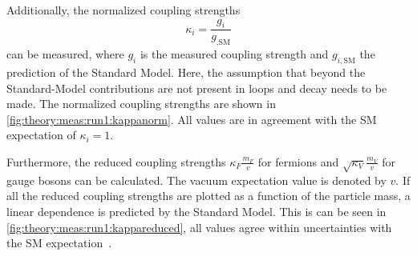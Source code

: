 Additionally, the normalized coupling strengths
\begin{equation}
    \kappa_i = \frac{g_i}{g_{,\text{SM}}}
\end{equation}
can be measured, where $g_i$ is the measured coupling strength and $g_{i,\text{SM}}$ the prediction of the Standard Model.
Here, the assumption that beyond the Standard-Model contributions are not present in loops and decay needs to be made.
The normalized coupling strengths are shown in \cref{fig:theory:meas:run1:kappanorm}.
All values are in agreement with the SM expectation of $\kappa_i = 1$.

Furthermore, the reduced coupling strengths $\kappa_F \frac{m_F}{v}$ for fermions and $\sqrt{\kappa_V} \frac{m_V}{v}$ for gauge bosons
can be calculated.
The vacuum expectation value is denoted by $v$.
If all the reduced coupling strengths are plotted as a function of the particle mass, a linear dependence is predicted by the Standard Model.
This is can be seen in \cref{fig:theory:meas:run1:kappareduced}, all values agree within uncertainties with the SM expectation~\cite{HiggsMuCombined}.

